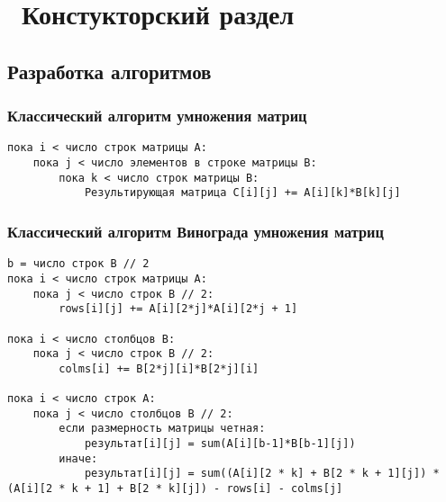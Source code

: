 \chapter{ Констукторский раздел}
\label{cha:design}
\section{ Разработка алгоритмов}

\subsection{ Классический алгоритм умножения матриц}

\begin{lstlisting}
пока i < число строк матрицы А:
	пока j < число элементов в строке матрицы B:
        пока k < число строк матрицы B:
		    Результирующая матрица C[i][j] += A[i][k]*B[k][j]
\end{lstlisting}	



\subsection{ Классический алгоритм Винограда умножения матриц}

\begin{lstlisting}
b = число строк B // 2
пока i < число строк матрицы А:
	пока j < число строк B // 2:
		rows[i][j] += A[i][2*j]*A[i][2*j + 1]

пока i < число столбцов B:
	пока j < число строк B // 2:
		colms[i] += B[2*j][i]*B[2*j][i]

пока i < число строк A:
	пока j < число cтолбцов B // 2:
		если размерность матрицы четная:
			результат[i][j] = sum(A[i][b-1]*B[b-1][j])
		иначе:
			результат[i][j] = sum((A[i][2 * k] + B[2 * k + 1][j]) * (A[i][2 * k + 1] + B[2 * k][j]) - rows[i] - colms[j]
\end{lstlisting}	



